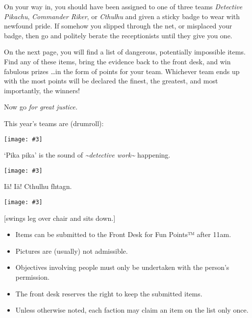 \newcommand{\team}[3]{
  \hfill
  \begin{minipage}[t]{0.3\textwidth}
    \begin{center}
      \texttt{[image: \#3]}
      \par\vspace{-0.5\baselineskip}
                 {\Large \altfont{#1}}
                 \par\vspace{-0.5\baselineskip}
                 #2
    \end{center}
  \end{minipage}
  \hfill
}

On your way in, you should have been assigned to one of three
teams \textemdash{} \emph{Detective Pikachu}, \emph{Commander Riker},
or \emph{Cthulhu} \textemdash{} and given a sticky badge to
wear with newfound pride. If somehow you slipped through the net, or
misplaced your badge, then go and politely berate the receptionists
until they give you one.

On the next page, you will find a list of dangerous, potentially
impossible items. Find any of these items, bring the evidence back to
the front desk, and win fabulous prizes \ldots in the form of points
for your team. Whichever team ends up with the most points will be
declared the finest, the greatest, and most importantly, the winners!

Now go \emph{for great justice.}

\vspace{1.8\baselineskip}

\begin{center} This year's teams are (drumroll): \end{center}

\vspace{\baselineskip}

\hfill
\team{The Pikachu\footnotemark[1]}{
  `Pika pika' is the sound of
  \emph{\textasciitilde detective work\textasciitilde} happening.
}{img/quest/pikachu.png}
\team{The Cthulhu\footnotemark[2]}{
  Iä! Iä! Cthulhu fhtagn.}{img/quest/cthulhu.png}
\team{The Rikers}{
  [swings leg over chair and sits down.]}{img/quest/riker.png}
\hfill

\vspace{1.8\baselineskip}

\begin{itemize}[leftmargin=*, itemsep=-0.7\baselineskip]
\item Items can be submitted to the Front Desk for Fun Points™ after 11am.
\item Pictures are (usually) not admissible.
\item Objectives involving people must only be undertaken with the
  person’s permission.
\item The front desk reserves the right to keep the submitted items.
\item Unless otherwise noted, each faction may claim an item on the
  list only once.
\end{itemize}


